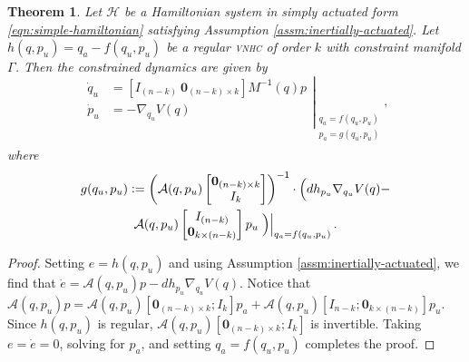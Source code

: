\documentclass[journal,twoside,web, twocolumn,draftcls]{ieeecolor}
\newtheorem{thm}{Theorem}%
\newcommand*{\inv}{^\mathsf{-1}}
\newcommand*{\Minv}{M^\mathsf{-1}}
\newcommand*{\Id}[1]{I_{#1}}
\newcommand*{\Zmat}[1]{\bm{0}_{#1}}
\newcommand*{\eqdef}{\vcentcolon=}
\newcommand*{\vnhc}{\textsc{vnhc}\xspace}
\begin{document}
\begin{thm}\label{thm:zero-dynamics}
    Let \(\mathcal{H}\) be a Hamiltonian system in simply actuated form
    \eqref{eqn:simple-hamiltonian} satisfying
    Assumption \ref{assm:inertially-actuated}. 
    Let \(h(q,p_u) = q_a - f(q_u,p_u)\) be a regular \vnhc of order \(k\) with
    constraint manifold \(\Gamma\). 
    Then the constrained dynamics are given by
    \begin{equation}\label{eqn:qpu-dynamics}
        \left.\begin{aligned}
                \dot{q}_u &= 
                \left[\Id{(n-k)} ~ \Zmat{(n-k) \times k}\right]
                \Minv(q)p \\
            \dot{p}_u &= -\nabla_{q_u}V(q) \\
            \end{aligned}{}\right|_{\begin{array}{c}
                q_a = f(q_u,p_u) \\ 
                p_a = g(q_u,p_u) \\
            \end{array}}
            ,
    \end{equation}
    where
    \begin{multline}\label{eqn:g-qpu}
        g(q_u,p_u) \eqdef \left( \mathcal{A}(q,p_u)
        \begin{bmatrix} \Zmat{(n-k)\times k} \\ \Id{k} \end{bmatrix}\right)\inv 
        \cdot
        \Big(dh_{p_u}\nabla_{q_u}V(q) -
        \\
        \mathcal{A}(q,p_u)
        \begin{bmatrix} \Id{(n-k)} \\ \Zmat{k \times (n-k)} \end{bmatrix} p_u
        \left.\Big)\right|_{q_a = f(q_u,p_u)}
        .
    \end{multline}

\end{thm}
\begin{proof}
    Setting \(e = h(q,p_u)\) and using Assumption
    \ref{assm:inertially-actuated}, we find that
    \(\dot{e} = \mathcal{A}(q,p_u)p - dh_{p_u}\nabla_{q_u}V(q)\).
    Notice that
    \(\mathcal{A}(q,p_u)p = \mathcal{A}(q,p_u)[\Zmat{(n-k)\times k}; \Id{k}]p_a
    + \mathcal{A}(q,p_u)[\Id{n-k};\Zmat{k \times (n-k)}] p_u\).
    Since \(h(q,p_u)\) is regular,
    \(\mathcal{A}(q,p_u)[\Zmat{(n-k)\times k}; \Id{k}]\) is invertible.
    Taking \(e = \dot{e} = 0\), solving for \(p_a\), and setting 
    \(q_a = f(q_u,p_u)\) completes the proof.
\end{proof}
\end{document}
